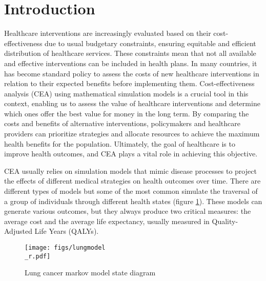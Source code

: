 \documentclass{IOS-Book-Article}
\def\hb{\hbox to 11.5 cm{}}
\begin{document}
	\markboth{July 2023\hb}{July 2023\hb}
	
	\section{Introduction}
	Healthcare interventions are increasingly evaluated based on their cost-effectiveness due to usual budgetary constraints, ensuring equitable and efficient distribution of healthcare services. These constraints mean that not all available and effective interventions can be included in health plans. In many countries, it has become standard policy to assess the costs of new healthcare interventions in relation to their expected benefits before implementing them. Cost-effectiveness analysis (CEA) using mathematical simulation models is a crucial tool in this context, enabling us to assess the value of healthcare interventions and determine which ones offer the best value for money in the long term\cite{drummond}. By comparing the costs and benefits of alternative interventions, policymakers and healthcare providers can prioritize strategies and allocate resources to achieve the maximum health benefits for the population. Ultimately, the goal of healthcare is to improve health outcomes, and CEA plays a vital role in achieving this objective\cite{levin}.
	
	CEA usually relies on simulation models that mimic disease processes to project the effects of different medical strategies on health outcomes over time\cite{applied_he}. There are different types of models but some of the most common simulate the traversal of a group of individuals through different health states (figure \ref{fig:lung_model}). These models can generate various outcomes, but they always produce two critical measures: the average cost and the average life expectancy, usually measured in Quality-Adjusted Life Years (QALYs)\cite{qalys}.
	
	\begin{figure}[h!]
		\centering	
		\texttt{[image: figs/lungmodel\\\_r.pdf]}		
		\caption{Lung cancer markov model state diagram}	
		\label{fig:lung_model}	
	\end{figure}
	
	
\end{document}
